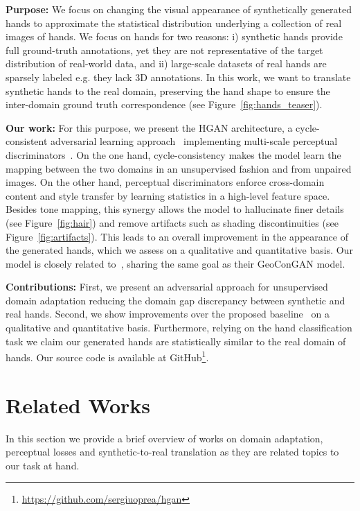 \vspace*{0.1cm}\noindent\textbf{Purpose:} We focus on changing the visual appearance of synthetically generated hands to approximate the statistical distribution underlying a collection of real images of hands. We focus on hands for two reasons: i) synthetic hands provide full ground-truth annotations, yet they are not representative of the target distribution of real-world data, and ii) large-scale datasets of real hands are sparsely labeled e.g. they lack 3D annotations. In this work, we want to translate synthetic hands to the real domain, preserving the hand shape to ensure the inter-domain ground truth correspondence (see Figure~\ref{fig:hands_teaser}).

\vspace*{0.1cm}\noindent\textbf{Our work:} For this purpose, we present the \ac{HGAN} architecture, a cycle-consistent adversarial learning approach~\cite{Zhu2017} implementing multi-scale perceptual discriminators~\cite{Sungatullina2018}. On the one hand, cycle-consistency makes the model learn the mapping between the two domains in an unsupervised fashion and from unpaired images. On the other hand, perceptual discriminators enforce cross-domain content and style transfer by learning statistics in a high-level feature space. Besides tone mapping, this synergy allows the model to hallucinate finer details (see Figure~\ref{fig:hair}) and remove artifacts such as shading discontinuities (see Figure~\ref{fig:artifacts}). This leads to an overall improvement in the appearance of the generated hands, which we assess on a qualitative and quantitative basis. Our model is closely related to~\cite{Mueller2018}, sharing the same goal as their \ac{GeoConGAN} model.

\vspace*{0.1cm}\noindent\textbf{Contributions:} First, we present an adversarial approach for unsupervised domain adaptation reducing the domain gap discrepancy between synthetic and real hands. Second, we show improvements over the proposed baseline~\cite{Mueller2018} on a qualitative and quantitative basis. Furthermore, relying on the hand classification task we claim our generated hands are statistically similar to the real domain of hands. Our source code is available at GitHub\footnote{\href{https://github.com/sergiuoprea/hgan}{https://github.com/sergiuoprea/hgan}}.

\section{Related Works}
\label{cha:synthtoreal:sec:relatedworks}
In this section we provide a brief overview of works on domain adaptation, perceptual losses and synthetic-to-real translation as they are related topics to our task at hand.

